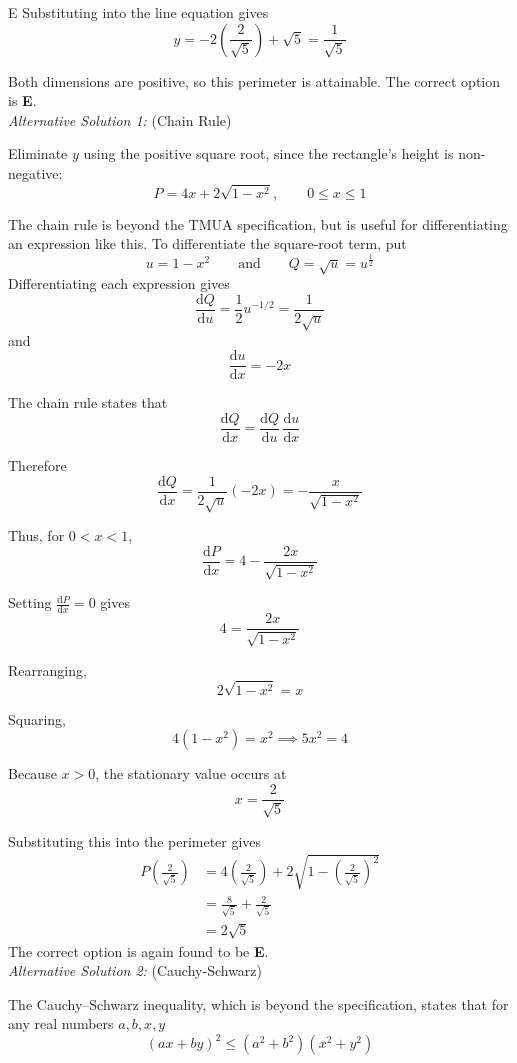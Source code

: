 \documentclass[11pt,a4paper]{article}
\begin{document}
\begin{enumerate}[label=\textbf{\arabic*.},leftmargin=*,itemsep=0pt,start=9]
\begin{djsSolution}{E}
Substituting into the line equation gives
\[
y=-2\left(\frac{2}{\sqrt5}\right)+\sqrt5=\frac{1}{\sqrt5}
\]

Both dimensions are positive, so this perimeter is attainable. The correct option is \textbf{E}.\\[5pt]

\textit{Alternative Solution 1:} (Chain Rule)

Eliminate $y$ using the positive square root, since the rectangle's height is non-negative:
\[
P=4x+2\sqrt{1-x^2},\qquad 0\leq x\leq1
\]

The chain rule is beyond the TMUA specification, but is useful for differentiating an expression like this. To differentiate the square-root term, put
\[
u=1-x^2 \qquad \text{and} \qquad Q = \sqrt{u} = u^\frac{1}{2}
\]
Differentiating each expression gives
\[
\frac{\mathrm{d}Q}{\mathrm{d}u}
=\frac12u^{-1/2}
=\frac{1}{2\sqrt u}
\]
and
\[
\frac{\mathrm{d}u}{\mathrm{d}x}=-2x
\]

The chain rule states that
\[
\frac{\mathrm{d}Q}{\mathrm{d}x}
=\frac{\mathrm{d}Q}{\mathrm{d}u}\,
\frac{\mathrm{d}u}{\mathrm{d}x}
\]

Therefore
\[
\frac{\mathrm{d}Q}{\mathrm{d}x}
=\frac{1}{2\sqrt u}(-2x)
=-\frac{x}{\sqrt{1-x^2}}
\]

Thus, for $0<x<1$,
\[
\frac{\mathrm{d}P}{\mathrm{d}x}
=4-\frac{2x}{\sqrt{1-x^2}}
\]

Setting $\frac{\mathrm{d}P}{\mathrm{d}x}=0$ gives
\[
4=\frac{2x}{\sqrt{1-x^2}}
\]

Rearranging,
\[
2\sqrt{1-x^2}=x
\]

Squaring,
\[
4(1-x^2)=x^2 \implies 5x^2=4
\]

Because $x>0$, the stationary value occurs at
\[
x=\frac{2}{\sqrt5}
\]

Substituting this into the perimeter gives
\[
\begin{aligned}
P\left(\frac{2}{\sqrt5}\right)
&=4\left(\frac{2}{\sqrt5}\right)+2\sqrt{1-\left(\frac{2}{\sqrt5}\right)^2}\\[8pt]
&=\frac{8}{\sqrt5}+\frac{2}{\sqrt5}\\[5pt]
&=2\sqrt5
\end{aligned}
\]
The correct option is again found to be \textbf{E}.\\[5pt]

\textit{Alternative Solution 2:} (Cauchy-Schwarz)

The Cauchy--Schwarz inequality, which is beyond the specification, states that for any real numbers $a,b,x,y$
\[
\left(ax+by\right)^2\leq\left(a^2+b^2\right)\left(x^2+y^2\right)
\]


\end{djsSolution}
\end{enumerate}
\end{document}
